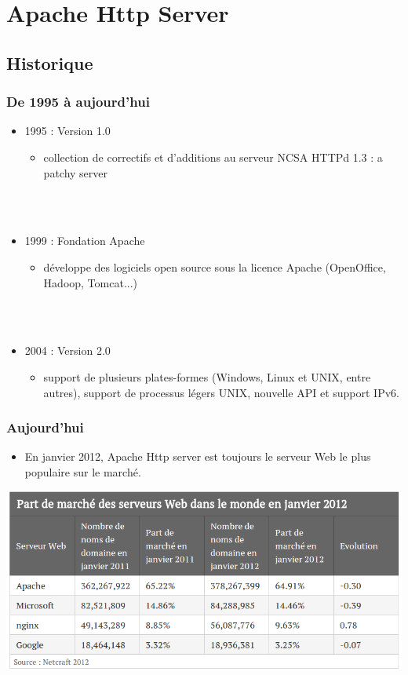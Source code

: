 \section{Apache Http Server}

\subsection{Historique}

\begin{frame}
	\frametitle{De 1995 à aujourd'hui}
	\begin{itemize}
		\item 1995 : Version 1.0
		    \begin{itemize}
			\item collection de correctifs et d'additions au serveur NCSA HTTPd 1.3 : \og{} a patchy server \fg{}
		    \end{itemize}
        ~\\~\\
		\item 1999 : Fondation Apache
		    \begin{itemize}
		    	\item développe des logiciels open source sous la licence Apache (OpenOffice, Hadoop, Tomcat...)
		    \end{itemize}
	~\\~\\
		\item 2004 : Version 2.0
		    \begin{itemize}
		    	\item support de plusieurs plates-formes (Windows, Linux et UNIX, entre autres), support de processus légers UNIX, nouvelle API et support IPv6.
		    \end{itemize}

	\end{itemize}
\end{frame}

\begin{frame}
	\frametitle{Aujourd'hui}
	\begin{itemize}
		\item En janvier 2012, Apache Http server est toujours le serveur Web le plus populaire sur le marché.
	\end{itemize}
	\begin{center}
		\includegraphics[scale=0.3]{Images/parts-marche.png}
	\end{center}
\end{frame}

